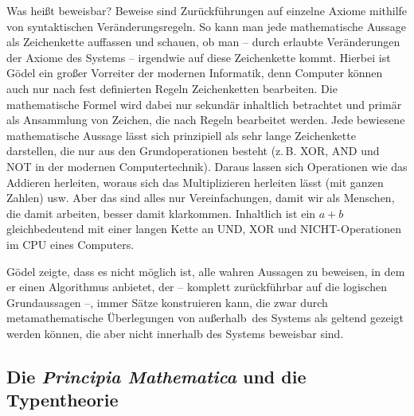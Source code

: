 Was heißt \frq beweisbar\flq? Beweise sind Zurückführungen auf einzelne Axiome mithilfe
von syntaktischen Veränderungsregeln. 
So kann man jede mathematische Aussage als Zeichenkette
auffassen und schauen, ob man -- durch erlaubte Veränderungen der Axiome des Systems --
irgendwie auf diese Zeichenkette kommt. Hierbei ist Gödel ein großer Vorreiter der
modernen Informatik, denn Computer können auch nur nach fest definierten Regeln
Zeichenketten bearbeiten. Die mathematische Formel wird dabei nur sekundär 
inhaltlich
betrachtet und primär als Ansammlung von Zeichen, die nach Regeln bearbeitet werden.
Jede bewiesene mathematische Aussage lässt sich prinzipiell als sehr lange Zeichenkette
darstellen, die nur aus den Grundoperationen besteht (z.\,B. XOR, AND und NOT in
der modernen Computertechnik). Daraus lassen sich Operationen wie das Addieren 
herleiten, woraus sich das Multiplizieren herleiten lässt (mit ganzen Zahlen) usw.
Aber das sind alles nur Vereinfachungen, damit wir als Menschen, die damit arbeiten,
besser damit klarkommen. Inhaltlich ist ein $a + b$ gleichbedeutend mit einer langen
Kette an UND, XOR und NICHT-Operationen im CPU eines Computers.

Gödel zeigte, dass es nicht möglich ist, alle wahren Aussagen zu beweisen, 
in dem er einen Algorithmus anbietet, der -- komplett zurückführbar auf die logischen 
Grundaussagen --, immer Sätze konstruieren kann, die zwar durch metamathematische
Überlegungen von \frq außerhalb\flq\ des Systems
als geltend gezeigt werden können, die aber nicht innerhalb des Systems beweisbar sind.

\subsection*{Die \textit{Principia Mathematica} und die Typentheorie}

